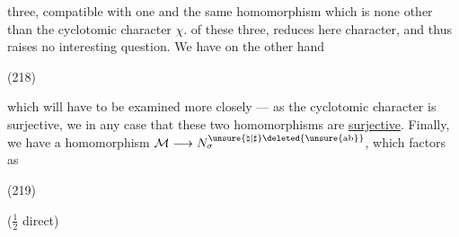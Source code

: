 
three, compatible with one and the same homomorphism
which is none other than the cyclotomic character $\chi$.
 of these three,
reduces here  character, and thus raises no interesting question. We have on the other hand

\begin{samepage}
\noindent (218)\quad
{}
\end{samepage}

which will have to be examined more closely --- as the cyclotomic character is  surjective, we  in any case that these two homomorphisms are \uline{surjective}. Finally, we have a homomorphism
$\mathcal M\longrightarrow N_{\sigma}^{\unsure{\natural|\sharp}\deleted{\unsure{\mathrm{ab}}}}$, which factors as

\begin{samepage}
\noindent (219)\quad
{}
\end{samepage}
\hfill ($\frac12$ direct)

